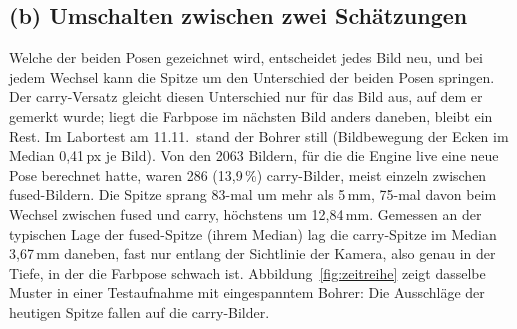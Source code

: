 \documentclass[11pt,a4paper,fleqn]{article}
\begin{document}
\subsection*{(b) Umschalten zwischen zwei Schätzungen}

Welche der beiden Posen gezeichnet wird, entscheidet jedes Bild neu, und bei jedem Wechsel kann die Spitze um den
Unterschied der beiden Posen springen. Der carry-Versatz gleicht diesen Unterschied nur für das Bild aus, auf dem
er gemerkt wurde; liegt die Farbpose im nächsten Bild anders daneben, bleibt ein Rest. Im Labortest am 11.11.\
stand der Bohrer still (Bildbewegung der Ecken im Median 0,41\,px je Bild). Von den 2063 Bildern, für die die
Engine live eine neue Pose berechnet hatte, waren 286 (13,9\,\%) carry-Bilder, meist einzeln zwischen
fused-Bildern. Die Spitze sprang 83-mal um mehr als 5\,mm,
75-mal davon beim Wechsel zwischen fused und carry, höchstens um 12,84\,mm. Gemessen an der typischen Lage der
fused-Spitze (ihrem Median) lag die carry-Spitze im Median 3,67\,mm daneben, fast nur entlang der Sichtlinie der
Kamera, also genau in der Tiefe, in der die Farbpose schwach ist. Abbildung~\ref{fig:zeitreihe} zeigt dasselbe
Muster in einer Testaufnahme mit eingespanntem Bohrer: Die Ausschläge der heutigen Spitze fallen auf die
carry-Bilder.
\end{document}
